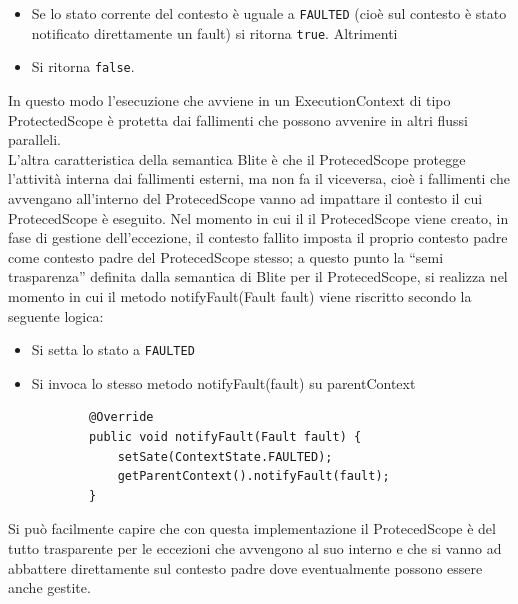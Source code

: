 \begin{itemize}
  \item Se lo stato corrente del contesto \`e uguale a \texttt{FAULTED} (cioè
  sul contesto \`e stato notificato direttamente un fault) si ritorna
  \texttt{true}. Altrimenti 
  \item Si ritorna \texttt{false}.
\end{itemize}

In questo modo l'esecuzione che avviene in un ExecutionContext di tipo
ProtectedScope \`e protetta dai fallimenti che possono avvenire in altri flussi
paralleli. 
\\

L'altra caratteristica della semantica Blite \`e che il ProtecedScope
protegge l'attività interna dai fallimenti esterni, ma non fa il
viceversa, cioè i fallimenti che avvengano all'interno del ProtecedScope vanno
ad impattare il contesto il cui ProtecedScope \`e eseguito. Nel momento in cui il
il ProtecedScope viene creato, in fase di gestione dell'eccezione, il contesto
fallito imposta il proprio contesto padre come contesto padre del
ProtecedScope stesso; a questo punto la ``semi trasparenza''
definita dalla semantica di Blite per il ProtecedScope, si realizza nel momento
in cui il metodo notifyFault(Fault fault) viene riscritto secondo la seguente
logica:

\begin{itemize}
  \item Si setta lo stato a \texttt{FAULTED}
  \item Si invoca lo stesso metodo notifyFault(fault) su parentContext
	\lstset{frame=NONE}
	\begin{lstlisting}
		@Override
   		public void notifyFault(Fault fault) {
        	setSate(ContextState.FAULTED);
        	getParentContext().notifyFault(fault);
    	}
  	\end{lstlisting}   
\end{itemize}

Si può facilmente capire che con questa implementazione il ProtecedScope è del
tutto trasparente per le eccezioni che avvengono al suo interno e che si vanno
ad abbattere direttamente sul contesto padre dove eventualmente possono essere
anche gestite.
